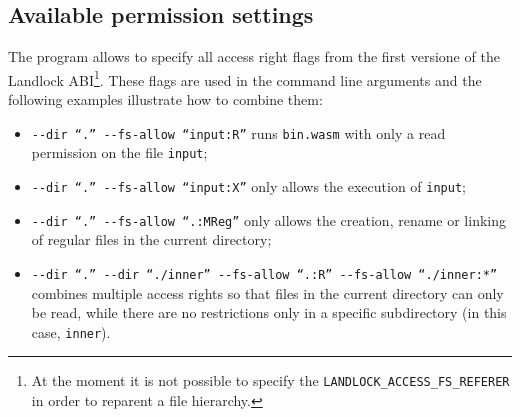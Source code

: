 \subsection{Available permission settings}

The program allows to specify all access right flags from the first versione of the Landlock
ABI\footnote{At the moment it is not possible to specify the \texttt{LANDLOCK\_ACCESS\_FS\_REFERER} in order to reparent a file hierarchy.}.
These flags are used in the command line arguments and the following examples illustrate how to combine them:
\begin{itemize}
  \item \texttt{-{}-dir ``.'' -{}-fs-allow ``input:R''} runs \texttt{bin.wasm} with only a read permission on the file \texttt{input};
  \item \texttt{-{}-dir ``.'' -{}-fs-allow ``input:X''} only allows the execution of \texttt{input};
  \item \texttt{-{}-dir ``.'' -{}-fs-allow ``.:MReg''} only allows the creation, rename or linking of regular files in the current directory;
  \item \texttt{-{}-dir ``.'' -{}-dir ``./inner'' -{}-fs-allow ``.:R'' -{}-fs-allow ``./inner:*''} combines multiple access rights so that
        files in the current directory can only be read, while there are no restrictions only in a specific subdirectory (in this case, \texttt{inner}).
\end{itemize}

